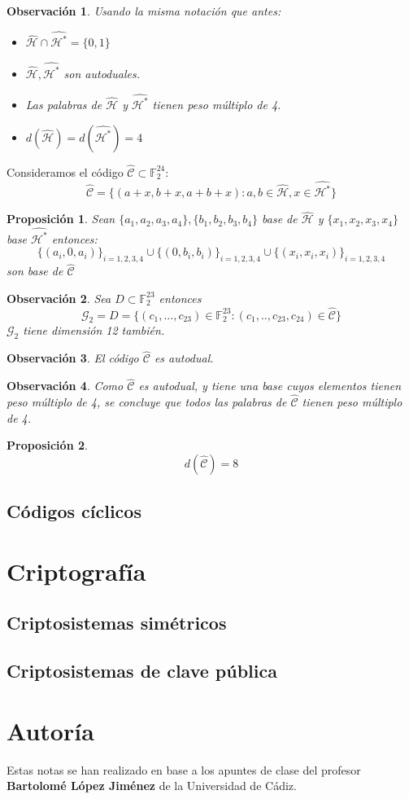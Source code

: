 \documentclass[spanish]{book}
\newtheorem{obsv}{Observación}
\newtheorem{proposi}{Proposición}
\begin{document}
\begin{obsv}
	Usando la misma notación que antes:
	\begin{itemize}
		\item $\hat{\mathcal{H}} \cap \hat{\mathcal{H}^*}=\{0, 1\}$
		\item $\hat{\mathcal{H}}, \hat{\mathcal{H}^*}$ son autoduales.
		\item Las palabras de $\hat{\mathcal{H}}$ y $\hat{\mathcal{H}^*}$ tienen peso múltiplo de 4.
		\item $d(\hat{\mathcal{H}})=d(\hat{\mathcal{H}^*})=4$
	\end{itemize}
	 
\end{obsv}
Consideramos el código $\hat{\mathcal{C}} \subset \mathbb{F}_2^{24}$: 
$$
\hat{\mathcal{C}}=\{(a+x, b+x, a+b+x): a, b \in \hat{\mathcal{H}}, x\in \hat{\mathcal{H}^*}\}$$

\begin{proposi}
	Sean $\{a_1, a_2, a_3, a_4\}, \{b_1, b_2, b_3, b_4\}$ base de $\hat{\mathcal{H}}$ y $\{x_1, x_2, x_3, x_4\}$ base $\hat{\mathcal{H}^*}$ entonces:
	$$ \{(a_i, 0, a_i)\}_{i=1, 2, 3, 4} \cup \{(0, b_i, b_i)\}_ {i=1,2,3,4} \cup \{(x_i, x_i, x_i)\}_{i=1,2,3,4} $$ son base de $\hat{\mathcal{C}}$
\end{proposi}

\begin{obsv}
	Sea $D \subset \mathbb{F}_2^{23}$ entonces
	$$\mathcal{G}_2 = D=\{(c_1, ..., c_{23}) \in \mathbb{F}_2^{23}: (c_1, .., c_{23}, c_{24}) \in \hat{\mathcal{C}} \}$$
	$\mathcal{G}_2$ tiene dimensión 12 también.
\end{obsv}

\begin{obsv}
	El código $\hat{\mathcal{C}}$ es autodual.
\end{obsv}

\begin{obsv}
	Como $\hat{\mathcal{C}}$ es autodual, y tiene una base cuyos elementos tienen peso múltiplo de 4, se concluye que todos las palabras de  $\hat{\mathcal{C}}$ tienen peso múltiplo de 4.
\end{obsv}

\begin{proposi}
	$$d(\hat{\mathcal{C}})=8$$
\end{proposi}
\section{Códigos cíclicos}

\chapter{Criptografía}
\section{Criptosistemas simétricos}
\section{Criptosistemas de clave pública}

\chapter*{Autoría}
Estas notas se han realizado en base a los apuntes de clase del profesor \textbf{Bartolomé López Jiménez} de la Universidad de Cádiz.
\end{document}
